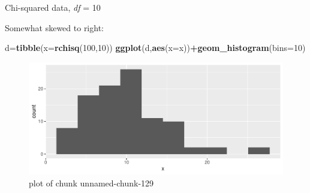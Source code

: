 \documentclass[ignorenonframetext,]{beamer}
\newenvironment{Shaded}{\begin{snugshade}}{\end{snugshade}}
\newcommand{\DataTypeTok}[1]{\textcolor[rgb]{0.13,0.29,0.53}{#1}}
\newcommand{\DecValTok}[1]{\textcolor[rgb]{0.00,0.00,0.81}{#1}}
\newcommand{\KeywordTok}[1]{\textcolor[rgb]{0.13,0.29,0.53}{\textbf{#1}}}
\newcommand{\NormalTok}[1]{#1}
\newcommand{\OperatorTok}[1]{\textcolor[rgb]{0.81,0.36,0.00}{\textbf{#1}}}
\begin{document}
\begin{frame}[fragile]{Chi-squared data, \emph{df} = 10}
\protect\hypertarget{chi-squared-data-df-10}{}

Somewhat skewed to right:

\begin{Shaded}
\begin{Highlighting}[]
\NormalTok{d=}\KeywordTok{tibble}\NormalTok{(}\DataTypeTok{x=}\KeywordTok{rchisq}\NormalTok{(}\DecValTok{100}\NormalTok{,}\DecValTok{10}\NormalTok{))}
\KeywordTok{ggplot}\NormalTok{(d,}\KeywordTok{aes}\NormalTok{(}\DataTypeTok{x=}\NormalTok{x))}\OperatorTok{+}\KeywordTok{geom_histogram}\NormalTok{(}\DataTypeTok{bins=}\DecValTok{10}\NormalTok{)}
\end{Highlighting}
\end{Shaded}

\begin{figure}
\centering
\includegraphics{figure/unnamed-chunk-129-1.pdf}
\caption{plot of chunk unnamed-chunk-129}
\end{figure}

\end{frame}
\end{document}
